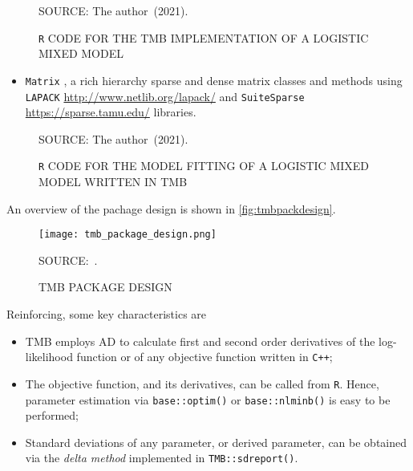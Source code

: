 \begin{figure}[H]
 \setlength{\abovecaptionskip}{.0001pt}
 \caption{\texttt{R} CODE FOR THE TMB IMPLEMENTATION OF A LOGISTIC MIXED
          MODEL}
 \vspace{0.3cm}\centering
 
 \begin{footnotesize}
  SOURCE: The author~(2021).
 \end{footnotesize}
 \label{fig:tmbex-p1}
\end{figure}

\begin{itemize}
 \item \texttt{Matrix} \cite{Matrix}, a rich hierarchy sparse and dense
       matrix classes and methods
       using \texttt{LAPACK} \url{http://www.netlib.org/lapack/}
       and \texttt{SuiteSparse} \url{https://sparse.tamu.edu/}
       libraries.
\end{itemize}

\begin{figure}[H]
 \setlength{\abovecaptionskip}{.0001pt}
 \caption{\texttt{R} CODE FOR THE MODEL FITTING OF A LOGISTIC MIXED
          MODEL WRITTEN IN TMB}
 \vspace{0.3cm}\centering
 
 \begin{footnotesize}
  SOURCE: The author~(2021).
 \end{footnotesize}
 \label{fig:tmbex-p2}
\end{figure}
\noindent
An overview of the pachage design is shown in
\autoref{fig:tmbpackdesign}.

\begin{figure}[H]
 \setlength{\abovecaptionskip}{.0001pt}
 \caption{TMB PACKAGE DESIGN}
 \vspace{0.35cm}\centering
 \texttt{[image: tmb\_package\_design.png]}\\
 \vspace{0.1cm}
 \begin{footnotesize}
  SOURCE:~.
 \end{footnotesize}
 \label{fig:tmbpackdesign}
\end{figure}
\noindent
Reinforcing, some key characteristics are
\begin{itemize}
 \item TMB employs AD to calculate first and second order derivatives of
       the log-likelihood function or of any objective function written
       in \texttt{C++};

 \item The objective function, and its derivatives, can be called
       from \texttt{R}. Hence, parameter estimation
       via \texttt{base::optim()} or \texttt{base::nlminb()} is easy to
       be performed;

 \item Standard deviations of any parameter, or derived parameter, can
       be obtained via the \textit{delta method} \cite{deltamethod}
       implemented in \texttt{TMB::sdreport()}.
\end{itemize}

